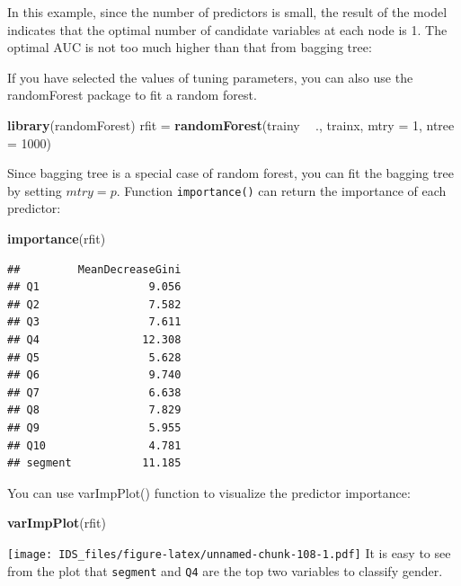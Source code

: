 \documentclass[12pt,]{krantz}
\makeatletter
\newenvironment{Shaded}{\begin{snugshade}}{\end{snugshade}}
\newcommand{\DataTypeTok}[1]{\textcolor[rgb]{0.27,0.27,0.27}{#1}}
\newcommand{\DecValTok}[1]{\textcolor[rgb]{0.06,0.06,0.06}{#1}}
\newcommand{\KeywordTok}[1]{\textcolor[rgb]{0.27,0.27,0.27}{\textbf{#1}}}
\newcommand{\NormalTok}[1]{#1}
\newcommand{\OperatorTok}[1]{\textcolor[rgb]{0.43,0.43,0.43}{\textbf{#1}}}
\newcommand{\StringTok}[1]{\textcolor[rgb]{0.5,0.5,0.5}{#1}}
\newenvironment{kframe}{%
\medskip{}
\setlength{\fboxsep}{.8em}
 \def\at@end@of@kframe{}%
 \ifinner\ifhmode%
  \def\at@end@of@kframe{\end{minipage}}%
  \begin{minipage}{\columnwidth}%
 \fi\fi%
 \def\FrameCommand##1{\hskip\@totalleftmargin \hskip-\fboxsep
 \colorbox{shadecolor}{##1}\hskip-\fboxsep
     \hskip-\linewidth \hskip-\@totalleftmargin \hskip\columnwidth}%
 \MakeFramed {\advance\hsize-\width
   \@totalleftmargin\z@ \linewidth\hsize
   \@setminipage}}%
 {\par\unskip\endMakeFramed%
 \at@end@of@kframe}
\renewenvironment{Shaded}{\begin{kframe}}{\end{kframe}}
\makeatother
\begin{document}
In this example, since the number of predictors is small, the result of the model indicates that the optimal number of candidate variables at each node is 1. The optimal AUC is not too much higher than that from bagging tree:

If you have selected the values of tuning parameters, you can also use the randomForest package to fit a random forest.

\begin{Shaded}
\begin{Highlighting}[]
\KeywordTok{library}\NormalTok{(randomForest)}
\NormalTok{rfit =}\StringTok{ }\KeywordTok{randomForest}\NormalTok{(trainy }\OperatorTok{~}\StringTok{ }\NormalTok{., trainx, }\DataTypeTok{mtry =} \DecValTok{1}\NormalTok{, }\DataTypeTok{ntree =} \DecValTok{1000}\NormalTok{)}
\end{Highlighting}
\end{Shaded}

Since bagging tree is a special case of random forest, you can fit the bagging tree by setting \(mtry=p\). Function \texttt{importance()} can return the importance of each predictor:

\begin{Shaded}
\begin{Highlighting}[]
\KeywordTok{importance}\NormalTok{(rfit)}
\end{Highlighting}
\end{Shaded}

\begin{verbatim}
##         MeanDecreaseGini
## Q1                 9.056
## Q2                 7.582
## Q3                 7.611
## Q4                12.308
## Q5                 5.628
## Q6                 9.740
## Q7                 6.638
## Q8                 7.829
## Q9                 5.955
## Q10                4.781
## segment           11.185
\end{verbatim}

You can use varImpPlot() function to visualize the predictor importance:

\begin{Shaded}
\begin{Highlighting}[]
\KeywordTok{varImpPlot}\NormalTok{(rfit)}
\end{Highlighting}
\end{Shaded}

\texttt{[image: IDS\_files/figure-latex/unnamed-chunk-108-1.pdf]}
It is easy to see from the plot that \texttt{segment} and \texttt{Q4} are the top two variables to classify gender.
\end{document}
